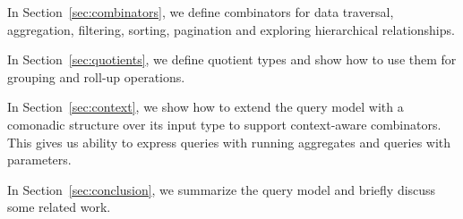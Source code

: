 In Section~\ref{sec:combinators}, we define combinators for data traversal,
aggregation, filtering, sorting, pagination and exploring hierarchical
relationships.

In Section~\ref{sec:quotients}, we define quotient types and show how to use
them for grouping and roll-up operations.

In Section~\ref{sec:context}, we show how to extend the query model with a
comonadic structure over its input type to support context-aware combinators.
This gives us ability to express queries with running aggregates and queries
with parameters.

In Section~\ref{sec:conclusion}, we summarize the query model and briefly
discuss some related work.

